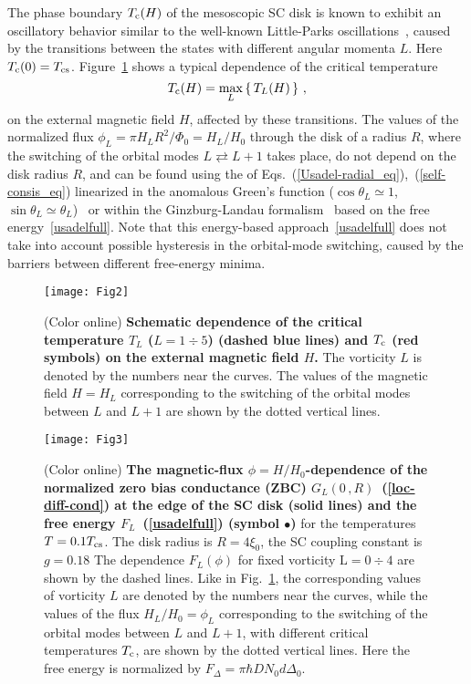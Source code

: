 \documentclass[prx,twocolumn,aps,superscriptaddress,showpacs,amsmath,amssymb,footnoteinbib]{revtex4-1}
\begin{document}
The phase boundary $T_{\rm c}(H)$ of the mesoscopic SC disk is
known to exhibit an oscillatory behavior similar to the well-known
Little-Parks oscillations~\cite{Little-PRL62,Parks-PRA64}, caused
by the transitions between the states with different angular
momenta $L$. Here $T_{\rm c}(0)=T_{\rm cs}$. Figure~\ref{Fig2-Tc(H)} shows a typical dependence of
the critical temperature
$$
 T_{\rm c}(H) = \underset{L}{\rm max} \left\{\,
 T_{L}(H)\,\right\}\,,
$$
on the external magnetic field $H$, affected by these transitions.
The values of the normalized flux $\phi_L = \pi H_L R^2 / \Phi_0 =
H_L / H_0$ through the disk of a radius $R$, where the switching
of the orbital modes $L \rightleftarrows L+1$ takes place, do not
depend on the disk radius $R$, and can be found using the of
Eqs.~(\ref{Usadel-radial_eq}),~(\ref{self-consis_eq}) linearized
in the anomalous Green's function ($\cos\theta_L \simeq 1$,
$\sin\theta_L \simeq \theta_L$)~\cite{Samokhvalov-PRB19-DOS} or
within the Ginzburg-Landau formalism~\cite{jadallah} based on the free energy~\eqref{usadelfull}.
Note that this energy-based approach~\eqref{usadelfull} does not take into account
possible hysteresis in the orbital-mode switching, caused by the barriers between different free-energy minima.
%
\begin{figure}[t!]
\texttt{[image: Fig2]}
\caption{(Color online) \textbf{Schematic dependence of the critical
temperature $T_{L}$ ($L = 1 \div 5$) (dashed blue lines) and
$T_{\rm c}$ (red symbols)  on the external magnetic field $H$.}
The vorticity $L$ is denoted by the numbers near the curves.
The values of the magnetic field $H = H_L$ corresponding to the switching of the
orbital modes between $L$ and $L+1$ are shown by the dotted vertical lines.}
\label{Fig2-Tc(H)}
\end{figure}
%
%
\begin{figure}[bh!]
\texttt{[image: Fig3]}
\caption{(Color online) \textbf{The magnetic-flux $\phi = H /
H_0$-dependence of the normalized zero bias conductance (ZBC)
$G_L(0\,,R)$~(\ref{loc-diff-cond}) at the edge of the SC disk
(solid lines) and the free energy $F_L$~(\ref{usadelfull}) (symbol
$\bullet$)} for the temperatures $T = 0. 1 T_{\rm cs}$. The disk
radius is $R = 4 \xi_0$, the SC coupling constant is $g = 0.18$
The dependence $F_L(\phi)$ for fixed vorticity $\mathrm{L=0 \div
4}$ are shown by the dashed lines. Like in Fig.~\ref{Fig2-Tc(H)},
the corresponding values of vorticity $L$ are denoted by the
numbers near the curves, while the values of the flux $H_L / H_0 =
\phi_L$ corresponding to the switching of the orbital modes
between $L$ and $L+1$, with different critical temperatures
$T_{\rm c}$, are shown by the dotted vertical lines. Here the free
energy is normalized by $F_\Delta = \pi \hbar D N_0 d \Delta_0$.}
\label{Fig3-FGL(H)}
\end{figure}
%
\end{document}
